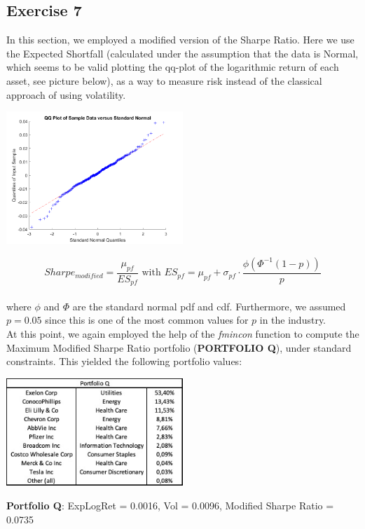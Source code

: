 \documentclass{assignment}
\begin{document}
\subsection*{Exercise 7}
In this section, we employed a modified version of the Sharpe Ratio. Here we use the Expected Shortfall (calculated under the assumption that the data is Normal, which seems to be valid plotting the qq-plot of the logarithmic return of each asset, see picture below), as a  way to measure risk instead of the classical approach of using volatility.
\begin{center}
    \includegraphics[width=0.50\textwidth]{assets/qqplot.png}
\end{center}
\bigskip
\[
    Sharpe_{modified} = \frac{\mu_{pf}}{ES_{pf}  } \text{ with }  ES_{pf} = \mu_{pf} + \sigma_{pf} \cdot
    \frac{\phi(\Phi^{-1}(1-p))}{p}
\]
\medskip \\
where $\phi$ and $\Phi$ are the standard normal pdf and cdf. Furthermore, we assumed $p=0.05$ since this is one of the most common values for $p$ in the industry.\\
At this point, we again employed the help of the \textit{fmincon} function to compute the Maximum Modified Sharpe Ratio portfolio (\textbf{PORTFOLIO Q}), under standard constraints. This yielded the following portfolio values:

\begin{center}
    \includegraphics[width=0.5\textwidth]{assets/Port_Q.jpg}
\end{center}
\bigskip
\textbf{Portfolio Q}: ExpLogRet = 0.0016, Vol = 0.0096, Modified Sharpe Ratio = 0.0735
\end{document}

